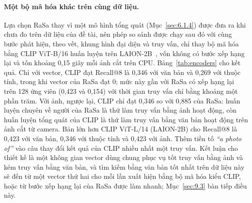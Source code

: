 \paragraph{Một bộ mã hóa khác trên cùng dữ liệu.} Lựa chọn RaSa thay vì một mô hình tổng quát (Mục~\ref{sec:6.1.4}) được đưa ra khi chưa đo trên dữ liệu của đề tài, nên phép so sánh được chạy sau đó với cùng bước phát hiện, theo vết, khung hình đại diện và truy vấn, chỉ thay bộ mã hóa bằng CLIP ViT-B/16 huấn luyện trên LAION-2B~\cite{radford2021clip}, vốn không có bước xếp hạng lại và tốn khoảng 0,15 giây mỗi ảnh cắt trên CPU. Bảng~\ref{tab:encoders} cho kết quả. Chỉ với vector, CLIP đạt Recall@8 là 0,346 với văn bản và 0,269 với thuộc tính, trong khi vector của RaSa đạt 0; mức này gần với RaSa có xếp hạng lại trên 128 ứng viên (0,423 và 0,154) với thời gian truy vấn chỉ bằng khoảng một phần trăm. Với ảnh, ngược lại, CLIP chỉ đạt 0,346 so với 0,885 của RaSa: huấn luyện chuyên về người của RaSa là thứ làm truy vấn bằng ảnh hoạt động, còn huấn luyện tổng quát của CLIP là thứ làm truy vấn bằng văn bản hoạt động trên ảnh cắt từ camera. Bản lớn hơn CLIP ViT-L/14 (LAION-2B) cho Recall@8 là 0,423 với văn bản, 0,346 với thuộc tính và 0,423 với ảnh. Thêm tiền tố \emph{``a photo of''} vào câu thay đổi kết quả của CLIP nhiều nhất một truy vấn. Kết luận cho thiết kế là một không gian vector dùng chung phục vụ tốt truy vấn bằng ảnh và kém truy vấn bằng văn bản, và tìm kiếm bằng văn bản tốt nhất trên dữ liệu này sẽ đến từ một vector thứ hai cho mỗi lần xuất hiện bằng bộ mã hóa kiểu CLIP, hoặc từ bước xếp hạng lại của RaSa được làm nhanh; Mục~\ref{sec:9.3} bàn tiếp điều này.


